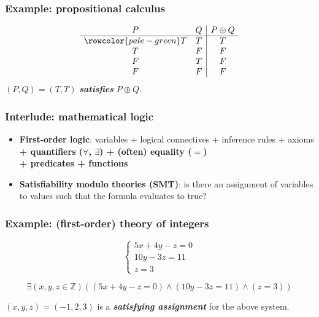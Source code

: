 \documentclass[11pt,table]{beamer}
\begin{document}
\begin{frame}
  \frametitle{Example: propositional calculus}
  \begin{displaymath}
    \begin{array}{c c | c}
      P & Q & P \oplus Q\\
      \hline
      \rowcolor{pale-green} T & T & T\\
      T & F & F\\
      F & T & F\\
      F & F & F\\
      \end{array}
  \end{displaymath}
  \bigskip
  \center $(P, Q) = (T, T)$ \textbf{\textit{satisfies}} $P \oplus Q$.
\end{frame}

\begin{frame}
  \frametitle{Interlude: mathematical logic}
  \begin{itemize}
  \item{\textbf{First-order logic}: variables + logical connectives 
    + inference rules + axioms \textbf{+ quantifiers ($\forall$, $\exists$) 
      + (often) equality ($=$) \\ 
      + predicates + functions} }
    \medskip
  \item{\textbf{Satisfiability modulo theories (SMT)}: is there an assignment of variables to values such that the formula evaluates to true?}
  \end{itemize}
\end{frame}

\begin{frame}
  \frametitle{Example: (first-order) theory of integers}
  \begin{displaymath}
    \begin{cases}
      5x + 4y - z = 0 \\
      10y - 3z = 11 \\
      z = 3
    \end{cases}
  \end{displaymath}
  
  \center\[ \exists (x, y, z \in \mathbb{Z})(
  (5x + 4y -z = 0) \wedge
  (10y - 3z = 11) \wedge
  (z = 3))
  \]
  
\center $(x, y, z) = (-1, 2, 3)$ is a \textbf{\textit{satisfying assignment}} for the above system.
\end{frame}
\end{document}
